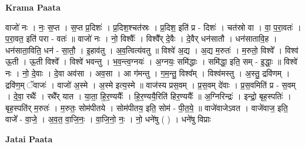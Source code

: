 \documentclass[17pt]{extarticle}
\begin{document}
\textbf{Krama Paata} \newline

वाजो॑ नः । नः॒ स॒प्त । स॒प्त प्र॒दिशः॑ । प्र॒दिश॒श्चत॑स्रः । प्र॒दिश॒ इति॑ प्र - दिशः॑ । चत॑स्रो वा । वा॒ प॒रा॒वतः॑ । प॒रा॒वत॒ इति॑ परा - वतः॑ ॥ वाजो॑ नः । नो॒ विश्वैः᳚ । विश्वै᳚र् दे॒वैः । दे॒वैर् धन॑सातौ । धन॑सातावि॒ह । धन॑साता॒विति॒ धन॑ - सा॒तौ॒ । इ॒हाव॑तु । अ॒व॒त्वित्य॑वतु ॥ विश्वे॑ अ॒द्य । अ॒द्य म॒रुतः॑ । म॒रुतो॒ विश्वे᳚ । विश्व॑ ऊ॒ती । ऊ॒ती विश्वे᳚ । विश्वे॑ भवन्तु । भ॒व॒न्त्व॒ग्नयः॑ । अ॒ग्नयः॒ समि॑द्धाः । समि॑द्धा॒ इति॒ सम् - इ॒द्धाः॒ ॥ विश्वे॑ नः । नो॒ दे॒वाः । दे॒वा अव॑सा । अव॒सा । आ ग॑मन्तु । ग॒म॒न्तु॒ विश्व᳚म् । विश्व॑मस्तु । अ॒स्तु॒ द्रवि॑णम् । द्रवि॑ण॒म् ॅवाजः॑ । वाजो॑ अ॒स्मे । अ॒स्मे इत्य॒स्मे ॥ वाज॑स्य प्रस॒वम् । प्र॒स॒वम् दे॑वाः । प्र॒स॒वमिति॑ प्र - स॒वम् । दे॒वा॒ रथैः᳚ । रथै᳚र् यात । या॒ता॒ हि॒र॒ण्ययैः᳚ । हि॒र॒ण्ययै॒रिति॑ हिर॒ण्ययैः᳚ ॥ अ॒ग्निरिन्द्रः॑ । इन्द्रो॒ बृह॒स्पतिः॑ । बृह॒स्पति॑र् म॒रुतः॑ । म॒रुतः॒ सोम॑पीतये । सोम॑पीतय॒ इति॒ सोम॑ - पी॒त॒ये॒ ॥ वाजे॑वाजेऽवत । वाजे॑वाज॒ इति॒ वाजे᳚ - वा॒जे॒ । अ॒व॒त॒ वा॒जि॒नः॒ । वा॒जि॒नो॒ नः॒ । नो॒ धने॑षु ( ) । धने॑षु विप्राः \newline

\textbf{Jatai Paata} \newline
\end{document}
